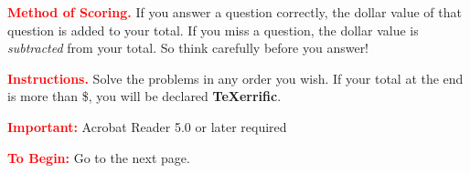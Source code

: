 \documentclass[dvips]{jj_game} %
\begin{document}
\begin{instructions}
%
%
\textcolor{red}{\textbf{Method of Scoring.}} If you answer a
question correctly, the dollar value of that question is added to
your total.  If you miss a question, the dollar value is
\textit{subtracted} from your total.  So think carefully before
you answer!

\textcolor{red}{\textbf{Instructions.}} Solve the problems in
any order you wish. If your total at the end is more than \$\Goal,
you will be declared  \textbf{\TeX errific}.


\textcolor{red}{\textbf{Important:}} Acrobat Reader 5.0 or later required

\textcolor{red}{\textbf{To Begin:}} Go to the next page.

\end{instructions}
\end{document}
